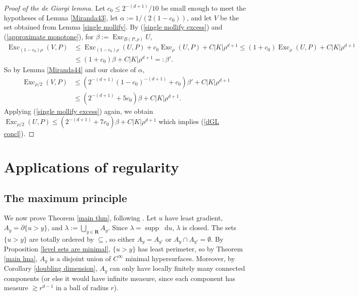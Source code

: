 \documentclass[reqno,10pt]{amsart}
\newcommand{\RR}{\mathbf{R}}
\DeclareMathOperator{\Exc}{Exc}
\DeclareMathOperator{\supp}{supp}
\newcommand*\dif{\mathop{}\!\mathrm{d}}
\theoremstyle{definition}
\numberwithin{equation}{section}
\begin{document}
\begin{proof}[Proof of the de Giorgi lemma]
Let $c_0 \leq 2^{-(d + 1)}/10$ be small enough to meet the hypotheses of Lemma \ref{Miranda43}, let $\alpha := 1/(2(1 - c_0))$, and let $V$ be the set obtained from Lemma \ref{single mollify}.
By (\ref{single mollify excess}) and (\ref{approximate monotone}), for $\beta := \Exc_{B(P, \rho)} U$,
\begin{align*}
\Exc_{(1 - c_0) \rho} (V, P) &\leq \Exc_{(1 - c_0) \rho} (U, P) + c_0 \Exc_\rho (U, P) + C|K| \rho^{d + 1} \leq (1 + c_0) \Exc_\rho (U, P) + C |K| \rho^{d + 1} \\
&\leq (1 + c_0) \beta + C |K| \rho^{d + 1} =: \beta'.
\end{align*}
So by Lemma \ref{Miranda44} and our choice of $\alpha$,
\begin{align*}
\Exc_{\rho/2} (V, P) &\leq (2^{-(d + 1)} (1 - c_0)^{-(d + 1)} + c_0) \beta' + C |K| \rho^{d + 1} \\
&\leq (2^{-(d + 1)} + 5c_0) \beta + C |K| \rho^{d + 1}.
\end{align*}
Applying (\ref{single mollify excess}) again, we obtain $\Exc_{\rho/2} (U, P) \leq (2^{-(d + 1)} + 7 c_0) \beta + C |K| \rho^{d +1}$ which implies (\ref{dGL concl}).
\end{proof}


\section{Applications of regularity}\label{GornySec}

\subsection{The maximum principle}\label{Max Princip}
We now prove Theorem \ref{main thm}, following \cite[pg7]{górny2017planar}.
Let $u$ have least gradient, $A_y = \partial \{u > y\}$, and $\lambda := \bigcup_{y \in \RR} A_y$.
Since $\lambda = \supp \dif u$, $\lambda$ is closed.
The sets $\{u > y\}$ are totally ordered by $\subseteq$, so either $A_y = A_{y'}$ or $A_y \cap A_{y'} = \emptyset$.
By Proposition \ref{level sets are minimal}, $\{u > y\}$ has least perimeter, so by Theorem \ref{main lma}, $A_y$ is a disjoint union of $C^\infty$ minimal hypersurfaces.
Moreover, by Corollary \ref{doubling dimension}, $A_y$ can only have locally finitely many connected components (or else it would have infinite measure, since each component has measure $\gtrsim r^{d - 1}$ in a ball of radius $r$).
\end{document}
